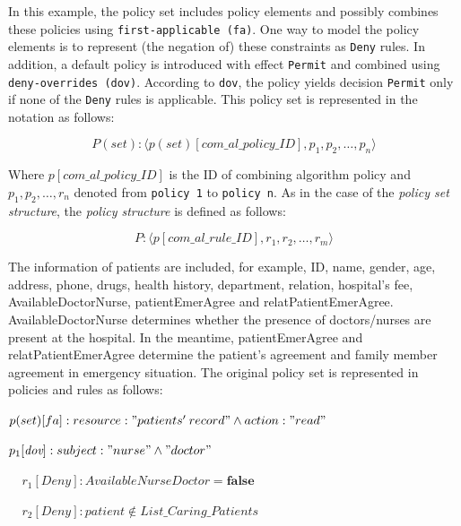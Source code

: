 \documentclass[conference]{IEEEtran}
\begin{document}
In this example, the policy set includes policy elements and possibly combines these policies using \texttt{first-applicable (fa)}. One way to model the policy elements is to represent (the negation of) these constraints as  \texttt{Deny} rules. 
In addition, a default policy is introduced with effect \texttt{Permit} and combined using \texttt{deny-overrides (dov)}. 
According to  \texttt{dov}, the policy yields decision  \texttt{Permit} only if none of the \texttt{Deny} rules is applicable. 
This policy set is represented in the notation as follows:

\begin{equation}
	\textit{$P(set)$}: \textit{$\langle p(set)[com\_al\_policy\_ID], p_1, p_2, \dots, p_n \rangle$}
\end{equation}

Where $p[com\_al\_policy\_ID]$ is the ID of combining algorithm policy and $p_1, p_2, \dots, r_n$ denoted from \texttt{policy 1} to \texttt{policy n}. As in the case of the \textit{policy set structure}, the \textit{policy structure} is defined as follows:

\begin{equation}
	\textit{$P$}: \textit{$\langle p[com\_al\_rule\_ID], r_1, r_2, \dots, r_m \rangle$}
\end{equation}

The information of patients are included, for example, ID, name, gender, age, address, phone, drugs, health history, department, relation, hospital's fee, AvailableDoctorNurse, %
patientEmerAgree and relatPatientEmerAgree. %
AvailableDoctorNurse determines whether the presence of doctors/nurses are present at the hospital.
In the meantime, patientEmerAgree and relatPatientEmerAgree determine the patient's agreement and family member agreement in emergency situation.
The original policy set is represented in policies and rules as follows:

$p(set)[fa]: resource : "patients'\: record" \wedge action : "read" $

$p_1[\textit{dov}] : subject : "nurse" \wedge "doctor"$

$\:\:\:\:\: r_1[\textit{Deny}] : AvailableNurseDoctor = \textbf{false}$

$\:\:\:\:\: r_2[\textit{Deny}] : patient \notin List\_Caring\_Patients$
\end{document}
